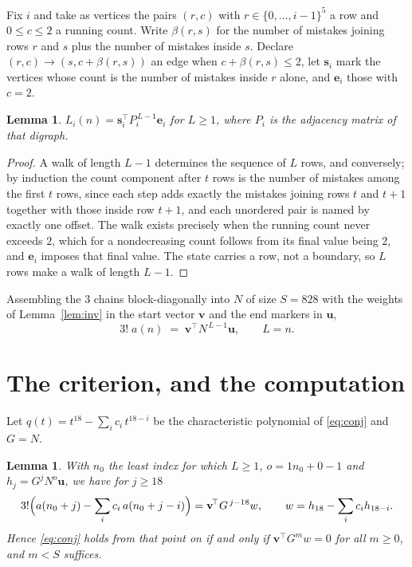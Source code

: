 \documentclass[11pt,a4paper]{article}
\theoremstyle{plain}
\newtheorem{lemma}[theorem]{Lemma}
\theoremstyle{definition}
\begin{document}
Fix $i$ and take as vertices the pairs $(r,c)$ with $r\in\{0,\dots,i-1\}^{5}$ a row
and $0\le c\le2$ a running count. Write $\beta(r,s)$ for the number of mistakes joining
rows $r$ and $s$ plus the number of mistakes inside $s$. Declare $(r,c)\to(s,c+\beta(r,s))$
an edge when $c+\beta(r,s)\le2$, let $\mathbf{s}_i$ mark the vertices whose count is the
number of mistakes inside $r$ alone, and $\mathbf{e}_i$ those with $c=2$.

\begin{lemma}\label{lem:walk}
$L_i(n)=\mathbf{s}_i^{\!\top}P_i^{\,L-1}\mathbf{e}_i$ for $L\ge1$, where $P_i$ is the
adjacency matrix of that digraph.
\end{lemma}

\begin{proof}
A walk of length $L-1$ determines the sequence of $L$ rows, and conversely; by induction
the count component after $t$ rows is the number of mistakes among the first $t$ rows,
since each step adds exactly the mistakes joining rows $t$ and $t+1$ together with those
inside row $t+1$, and each unordered pair is named by exactly one offset. The walk exists
precisely when the running count never exceeds $2$, which for a nondecreasing count follows
from its final value being $2$, and $\mathbf{e}_i$ imposes that final value. The state
carries a row, not a boundary, so $L$ rows make a walk of length $L-1$.
\end{proof}

Assembling the $3$ chains block-diagonally into $N$ of size $S=828$ with the weights of
Lemma~\ref{lem:inv} in the start vector $\mathbf{v}$ and the end markers in
$\mathbf{u}$,
\begin{equation}\label{eq:walk2}
3!\;a(n)\;=\;\mathbf{v}^{\!\top}N^{\,L-1}\mathbf{u},\qquad L=n .
\end{equation}

\section{The criterion, and the computation}

Let $q(t)=t^{18}-\sum_i c_i\,t^{18-i}$ be the characteristic polynomial of
\eqref{eq:conj} and $G=N$.

\begin{lemma}\label{lem:crit}
With $n_0$ the least index for which $L\ge1$, $o=1n_0+0-1$ and
$h_j=G^{j}N^{o}\mathbf{u}$, we have for $j\ge18$
\[
3!\Bigl(a(n_0+j)-\sum_i c_i\,a(n_0+j-i)\Bigr)=\mathbf{v}^{\!\top}G^{\,j-18}w,
\qquad w=h_{18}-\sum_i c_ih_{18-i} .
\]
Hence \eqref{eq:conj} holds from that point on if and only if
$\mathbf{v}^{\!\top}G^{m}w=0$ for all $m\ge0$, and $m<S$ suffices.
\end{lemma}
\end{document}
